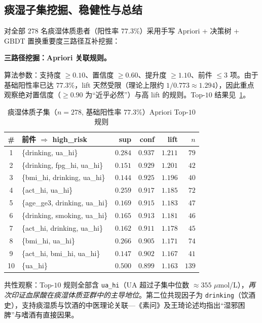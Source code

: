 \documentclass{MathorCupmodeling}
\begin{document}
\subsection{痰湿子集挖掘、稳健性与总结}\label{sec:q2-apriori}

对全部 $278$ 名痰湿体质患者（阳性率 $77.3\%$）采用手写 Apriori + 决策树 + GBDT 置换重要度三路径互补挖掘：

\noindent\textbf{三路径挖掘：Apriori 关联规则。}

算法参数：支持度 $\ge 0.10$、置信度 $\ge 0.60$、提升度 $\ge 1.10$、前件 $\le 3$ 项。由于基础阳性率已达 $77.3\%$，lift 天然受限（理论上限约 $1/0.773\approx 1.294$），因此重点观察绝对置信度（$\ge 0.90$ 为``近乎必然''）与高 lift 的规则。Top-$10$ 结果见~\cref{tab:q2-apriori}。

\begin{table}[H]
\centering\small
\caption{痰湿体质子集（$n=278$, 基础阳性率 $77.3\%$）Apriori Top-$10$ 规则}\label{tab:q2-apriori}
\begin{tabular}{@{}c l r r r r@{}}
\toprule
\# & 前件 $\Rightarrow$ high\_risk & sup & conf & lift & $n$ \\
\midrule
1 & \{drinking, ua\_hi\} & $0.284$ & $0.937$ & $1.211$ & $79$ \\
2 & \{drinking, fpg\_hi, ua\_hi\} & $0.151$ & $0.929$ & $1.201$ & $42$ \\
3 & \{bmi\_hi, drinking, ua\_hi\} & $0.144$ & $0.925$ & $1.196$ & $40$ \\
4 & \{act\_hi, ua\_hi\} & $0.259$ & $0.917$ & $1.185$ & $72$ \\
5 & \{age\_ge3, drinking, ua\_hi\} & $0.169$ & $0.915$ & $1.183$ & $47$ \\
6 & \{drinking, smoking, ua\_hi\} & $0.165$ & $0.913$ & $1.181$ & $46$ \\
7 & \{act\_hi, drinking, ua\_hi\} & $0.162$ & $0.911$ & $1.178$ & $45$ \\
8 & \{bmi\_hi, ua\_hi\} & $0.266$ & $0.905$ & $1.171$ & $74$ \\
9 & \{act\_hi, bmi\_hi, ua\_hi\} & $0.147$ & $0.902$ & $1.167$ & $41$ \\
10 & \{ua\_hi\} & $0.500$ & $0.899$ & $1.163$ & $139$ \\
\bottomrule
\end{tabular}
\end{table}

共性观察：Top-$10$ 规则全部含 \texttt{ua\_hi}（UA 超过子集中位数 $\approx 355$ $\mu$mol/L），\emph{再次印证血尿酸在痰湿体质亚群中的主导地位}。第二位共现因子为 \texttt{drinking}（饮酒史），支持痰湿质与饮酒的中医理论关联---《素问》及王琦论述均指出``湿邪困脾''与嗜酒有直接因果\cite{wang2005}。
\end{document}
